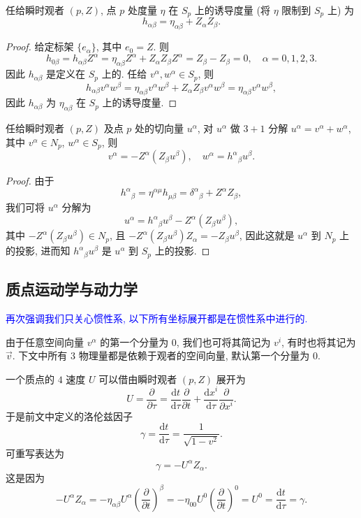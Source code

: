 \begin{proposition}
    任给瞬时观者 $(p,Z)$, 点 $ p $ 处度量 $ \eta $ 在 $ S_p $ 上的诱导度量 (将 $ \eta $ 限制到 $ S_p $ 上)  为
    \[ h_{\alpha\beta}=\eta_{\alpha\beta}+Z_{\alpha}Z_{\beta}. \]
\end{proposition}
\begin{proof}
    给定标架 $\{e_\alpha\}$, 其中 $e_0=Z$. 则 
    \[ h_{0\beta}=h_{\alpha\beta}Z^{\alpha}=\eta_{\alpha\beta}Z^\alpha+Z_{\alpha}Z_{\beta}Z^{\alpha}=Z_\beta-Z_\beta=0,\quad \alpha=0,1,2,3. \]
    因此 $h_{\alpha\beta}$ 是定义在 $S_p$ 上的.
    任给 $v^{\alpha},w^{\alpha}\in S_p$, 则
    \[ h_{\alpha\beta}v^{\alpha}w^{\beta}=\eta_{\alpha\beta}v^{\alpha}w^{\beta}+Z_{\alpha} Z_{\beta}v^{\alpha}w^{\beta}=\eta_{\alpha\beta}v^{\alpha}w^{\beta}, \]
    因此 $h_{\alpha\beta}$ 为 $\eta_{\alpha\beta}$ 在 $S_p$ 上的诱导度量.
\end{proof}

\begin{proposition}
    任给瞬时观者 $(p,Z)$ 及点 $p$ 处的切向量 $u^{\alpha}$, 对 $u^{\alpha}$ 做 $3+1$ 分解 $u^{\alpha}=v^{\alpha}+w^{\alpha}$, 其中 $v^{\alpha}\in N_p$, $w^{\alpha}\in S_p$, 则
    \[ v^{\alpha} = -Z^{\alpha}(Z_{\beta}u^{\beta}),\quad
        w^{\alpha} = h^{\alpha}{}_{\beta}u^{\beta}. \]
\end{proposition}
\begin{proof}
    由于
    \[ h^{\alpha}{}_{\beta}=\eta^{\alpha\mu}h_{\mu\beta}=\delta^{\alpha}{}_{\beta}+Z^{\alpha}Z_{\beta}, \]
    我们可将 $u^{\alpha}$ 分解为
    \[ u^{\alpha}=h^{\alpha}{}_{\beta}u^{\beta}-Z^{\alpha}(Z_{\beta}u^{\beta}), \]
    其中 $ -Z^{\alpha}(Z_{\beta}u^{\beta})\in N_p $, 且 $-Z^{\alpha}(Z_{\beta}u^{\beta})Z_\alpha=-Z_{\beta}u^{\beta}$, 因此这就是 $u^{\alpha}$ 到 $N_p$ 上的投影, 进而知 $h^{\alpha}{}_{\beta}u^{\beta}$ 是 $u^{\alpha}$ 到 $S_p$ 上的投影.
\end{proof}

\subsection{质点运动学与动力学}
\textcolor{blue}{再次强调我们只关心惯性系, 以下所有坐标展开都是在惯性系中进行的.}

由于任意空间向量 $v^\alpha$ 的第一个分量为 $0$, 我们也可将其简记为 $v^i$, 有时也将其记为 $\vec{v}$. 下文中所有 $3$ 物理量都是依赖于观者的空间向量, 默认第一个分量为 $0$.

一个质点的 $ 4 $ 速度 $ U $ 可以借由瞬时观者 $ (p,Z) $ 展开为
\[ U=\frac{\partial}{\partial\tau}=\frac{\mathrm{d}t}{\mathrm{d}\tau}\frac{\partial}{\partial t}+\frac{\mathrm{d}x^{i}}{\mathrm{d}\tau}\frac{\partial}{\partial x^i}. \]
于是前文中定义的洛伦兹因子
\[ \gamma=\frac{\mathrm{d}t}{\mathrm{d}\tau}=\frac{1}{\sqrt{1-v^2}}. \]
可重写表达为
\[ \gamma=-U^\alpha Z_\alpha. \]
这是因为
\[ -U^\alpha Z_\alpha=-\eta_{\alpha\beta}U^\alpha\left( \frac{\partial}{\partial t} \right)^{\beta}=-\eta_{00}U^0\left( \frac{\partial}{\partial t} \right)^0=U^0=\frac{\mathrm{d}t}{\mathrm{d}\tau}=\gamma. \]

